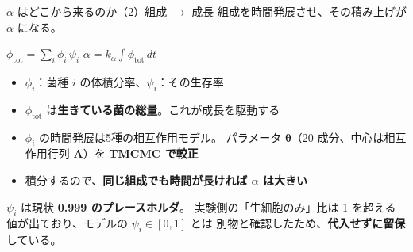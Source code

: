 \documentclass[aspectratio=169,11pt]{beamer}
\begin{document}
\begin{frame}{$\alpha$ はどこから来るのか（2）組成 $\rightarrow$ 成長}
\small 組成を時間発展させ、その積み上げが $\alpha$ になる。
\vspace{5pt}
\begin{center}
\colorbox{c3!10}{\parbox{0.86\linewidth}{\centering\small
$\phi_{\text{tot}} = \sum_i \phi_i\,\psi_i$
\qquad\qquad
$\alpha = k_\alpha \displaystyle\int \phi_{\text{tot}}\,dt$}}
\end{center}
\vspace{6pt}
\begin{itemize}\small
  \item $\phi_i$：菌種 $i$ の体積分率、$\psi_i$：その生存率
  \item $\phi_{\text{tot}}$ は\textbf{生きている菌の総量}。これが成長を駆動する
  \item $\phi_i$ の時間発展は5種の相互作用モデル。
        パラメータ $\bm{\theta}$（20 成分、中心は相互作用行列 $\bm{A}$）を
        \textbf{TMCMC で較正}
  \item 積分するので、\textbf{同じ組成でも時間が長ければ $\alpha$ は大きい}
\end{itemize}
\vspace{5pt}
\small $\psi_i$ は現状 \textbf{0.999 のプレースホルダ}。
実験側の「生細胞のみ」比は 1 を超える値が出ており、モデルの $\psi_i\in[0,1]$ とは
別物と確認したため、\textbf{代入せずに留保}している。
\end{frame}
\end{document}
